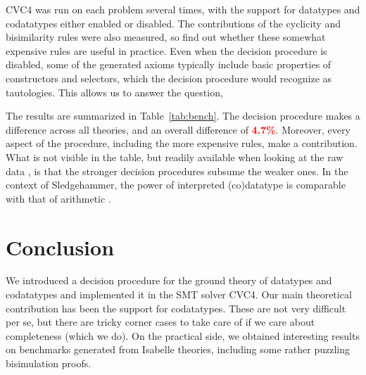 CVC4 was run on each problem several times, with the support for datatypes and
codatatypes either enabled or disabled. The contributions of the cyclicity and
bisimilarity rules were also measured, so find out whether these somewhat
expensive rules are useful in practice. Even when the decision procedure is
disabled, some of the generated axioms typically include basic properties of
constructors and selectors, which the decision procedure would recognize as
tautologies. This allows us to answer the question, 

\newcommand\BAD[1]{\textcolor{red}{\textbf{#1}}}



The results are summarized in Table~\ref{tab:bench}. The decision procedure
makes a difference across all theories, and an overall difference of
\BAD{4.7\%}. Moreover, every aspect of the procedure, including the more
expensive rules, make a contribution. What is not visible in the table, but
readily available when looking at the raw data \cite{our-eval-data}, is that
the stronger decision procedures subsume the weaker ones. In the context of
Sledgehammer, the power of interpreted (co)datatype is comparable with that of
arithmetic \cite{blanchette-et-al-2013-smt}.


\section{Conclusion}
\label{sec:conclusion}

We introduced a decision procedure for the ground theory of datatypes and
codatatypes and implemented it in the SMT solver CVC4. Our main theoretical
contribution has been the support for codatatypes. These are not very
difficult per se, but there are tricky corner cases to take care of if we care
about completeness (which we do).
On the practical side, we obtained
interesting results on benchmarks generated from Isabelle theories, including
some rather
puzzling bisimulation proofs.

